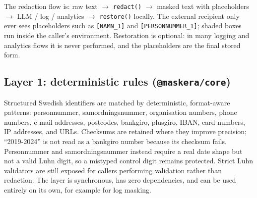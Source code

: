 \documentclass[10pt,a4paper]{article}
\newcommand{\pkg}[1]{\texttt{#1}}
\begin{document}
The redaction flow is: raw text $\rightarrow$ \pkg{redact()} $\rightarrow$
masked text with placeholders $\rightarrow$ LLM / log / analytics
$\rightarrow$ \pkg{restore()} locally. The external recipient only ever sees
placeholders such as \texttt{[NAMN\_1]} and \texttt{[PERSONNUMMER\_1]};
shaded boxes run inside the caller's environment. Restoration is optional:
in many logging and analytics flows it is never performed, and the
placeholders are the final stored form.

\begin{figure}[h]
\centering
{}
\end{figure}

\subsection{Layer 1: deterministic rules (\pkg{@maskera/core})}

Structured Swedish identifiers are matched by deterministic, format-aware
patterns: personnummer, samordningsnummer, organisation numbers, phone numbers,
e-mail addresses, postcodes, bankgiro, plusgiro, IBAN, card numbers, IP
addresses, and URLs. Checksums are retained where they improve precision;
``2019-2024'' is not read as a bankgiro number because its checksum fails.
Personnummer and samordningsnummer instead require a real date shape but not a
valid Luhn digit, so a mistyped control digit remains protected. Strict Luhn
validators are still exposed for callers performing validation rather than
redaction. The layer is synchronous, has zero dependencies, and can be used
entirely on its own, for example for log masking.
\end{document}
